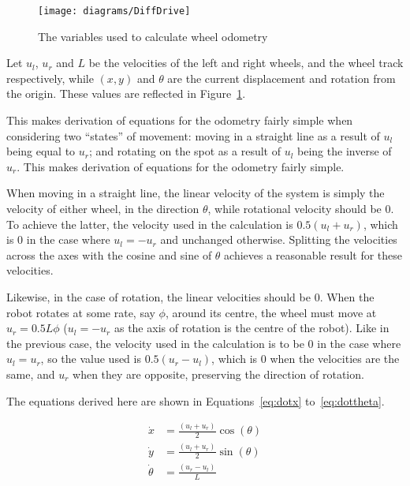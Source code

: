 \begin{figure}[!ht]
	\centering
	\texttt{[image: diagrams/DiffDrive]}
	\caption{The variables used to calculate wheel odometry}
	\label{fig:diff_drive_diagram}
\end{figure}

Let $u_l$, $u_r$ and $L$ be the velocities of the left and right wheels, and the
wheel track respectively, while $(x, y)$ and $\theta$ are the current displacement
and rotation from the origin. These values are reflected in Figure~\ref{fig:diff_drive_diagram}.

This makes derivation of
equations for the odometry fairly simple when considering two ``states'' of movement:
moving in a straight line as a result of $u_l$ being equal to $u_r$; and rotating on
the spot as a result of $u_l$ being the inverse of $u_r$. This makes derivation of
equations for the odometry fairly simple.

When moving in a straight line, the linear velocity of the system is simply the
velocity of either wheel, in the direction $\theta$, while rotational velocity
should be $0$. To achieve the latter, the velocity used in the calculation is $0.5 (u_l + u_r)$, which is $0$ in the case where $u_l = -u_r$ and unchanged otherwise.
Splitting the velocities across the axes with the cosine and sine of $\theta$ achieves a reasonable result for these velocities.

Likewise, in the case of rotation, the linear velocities should be $0$. When the
robot rotates at some rate, say $\phi$, around its centre, the wheel must move at $u_r = 0.5 L \phi$ ($u_l = -u_r$ as the axis of rotation is the centre of the
robot). Like in the previous case, the velocity used in the calculation is to be 0
in the case where $u_l = u_r$, so the value
used is $0.5 (u_r - u_l)$, which is $0$ when the velocities are the same, and $u_r$ when they are opposite, preserving the direction of rotation.

The equations derived here are shown in Equations~\ref{eq:dotx} to~\ref{eq:dottheta}.


\begin{align}
\dot{x} & = \frac{(u_l + u_r)}{2} \cos(\theta) \label{eq:dotx} \\
\dot{y} & = \frac{(u_l + u_r)}{2} \sin(\theta) \label{eq:doty} \\
\dot{\theta} & = \frac{(u_r - u_l)}{L} \label{eq:dottheta}
\end{align}

